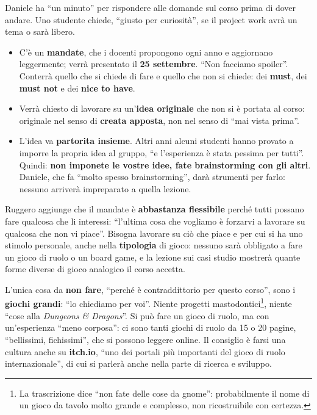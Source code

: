 Daniele ha ``un minuto'' per rispondere alle domande sul corso prima di dover
andare. Uno studente chiede, ``giusto per curiosità'', se il project work avrà
un tema o sarà libero.

\begin{itemize}
  \item C'è un \textbf{mandate}, che i docenti propongono ogni anno e
        aggiornano leggermente; verrà presentato il \textbf{25 settembre}.
        ``Non facciamo spoiler''. Conterrà quello che si chiede di fare e quello
        che non si chiede: dei \textbf{must}, dei \textbf{must not} e dei
        \textbf{nice to have}.
  \item Verrà chiesto di lavorare su un'\textbf{idea originale} che non si è
        portata al corso: originale nel senso di \textbf{creata apposta}, non
        nel senso di ``mai vista prima''.
  \item L'idea va \textbf{partorita insieme}. Altri anni alcuni studenti hanno
        provato a imporre la propria idea al gruppo, ``e l'esperienza è stata
        pessima per tutti''. Quindi: \textbf{non imponete le vostre idee, fate
        brainstorming con gli altri}. Daniele, che fa ``molto spesso
        brainstorming'', darà strumenti per farlo: nessuno arriverà impreparato
        a quella lezione.
\end{itemize}

Ruggero aggiunge che il mandate è \textbf{abbastanza flessibile} perché tutti
possano fare qualcosa che li interessi: ``l'ultima cosa che vogliamo è forzarvi a
lavorare su qualcosa che non vi piace''. Bisogna lavorare su ciò che piace e per
cui si ha uno stimolo personale, anche nella \textbf{tipologia} di gioco: nessuno
sarà obbligato a fare un gioco di ruolo o un board game, e la lezione sui casi
studio mostrerà quante forme diverse di gioco analogico il corso accetta.

L'unica cosa da \textbf{non fare}, ``perché è contraddittorio per questo corso'',
sono i \textbf{giochi grandi}: ``lo chiediamo per voi''. Niente progetti
mastodontici\footnote{La trascrizione dice ``non fate delle cose da gnome'':
probabilmente il nome di un gioco da tavolo molto grande e complesso, non
ricostruibile con certezza.}, niente ``cose alla \emph{Dungeons \& Dragons}''.
Si può fare un gioco di ruolo, ma con un'esperienza ``meno corposa'': ci sono
tanti giochi di ruolo da 15 o 20 pagine, ``bellissimi, fichissimi'', che si
possono leggere online. Il consiglio è farsi una cultura anche su
\textbf{itch.io}, ``uno dei portali più importanti del gioco di ruolo
internazionale'', di cui si parlerà anche nella parte di ricerca e sviluppo.

